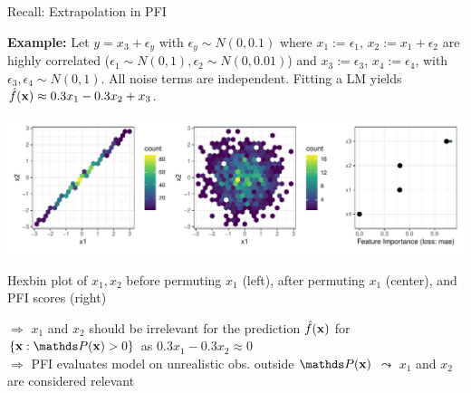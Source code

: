 \documentclass[11pt,compress,t,notes=noshow, aspectratio=169, xcolor=table]{beamer}
\begin{document}
\begin{frame}{Recall: Extrapolation in PFI}
 
 \textbf{Example:} Let $y = x_3 + \epsilon_y$ with $\epsilon_y \sim N(0, 0.1)$ where $x_1 :=  \epsilon_1$, $x_2 := x_1 + \epsilon_2$ are highly correlated ($\epsilon_1 \sim N(0,1), \epsilon_2 \sim N(0, 0.01)$) and $x_3 := \epsilon_3$, $x_4 := \epsilon_4$,  with $\epsilon_3, \epsilon_4 \sim N(0,1)$. All noise terms are independent.
 Fitting a LM yields $\fh(\xv) \approx 0.3 x_1 - 0.3 x_2 + x_3$.

\centerline{\includegraphics[width=0.9\linewidth]{figure_man/pfi_hexbin_extrapolation.pdf}}
\centerline{Hexbin plot of $x_1, x_2$ before permuting $x_1$ (left), after permuting $x_1$ (center), and PFI scores (right)}
\lz
% 
$\Rightarrow$ $x_1$ and $x_2$ should be irrelevant for the prediction $\fh(\xv)$ for $\{\xv: \P(\xv) > 0\}$ as $0.3 x_1 - 0.3 x_2 \approx 0$ \\
$\Rightarrow$ PFI evaluates model on unrealistic obs. outside $\P(\xv)$ $\leadsto$ $x_1$ and $x_2$ are considered relevant

 \end{frame}


 
 
\end{document}
